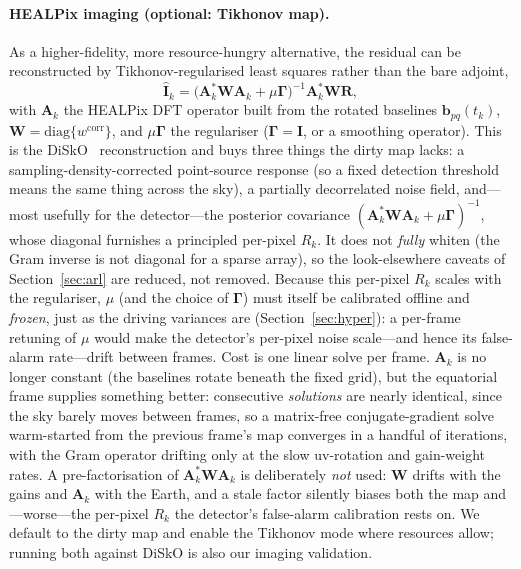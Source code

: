 \documentclass[11pt]{article}
\begin{document}
\paragraph{HEALPix imaging (optional: Tikhonov map).} As a higher-fidelity, more resource-hungry
alternative, the residual can be reconstructed by Tikhonov-regularised least squares rather than the
bare adjoint,
\begin{equation}
  \hat{\bm{I}}_k=\big(\bm{A}_k^{\!*}\bm{W}\bm{A}_k+\mu\bm{\Gamma}\big)^{-1}\bm{A}_k^{\!*}\bm{W}\bm{R},
\end{equation}
with $\bm{A}_k$ the HEALPix DFT operator built from the rotated baselines $\bm{b}_{pq}(t_k)$,
$\bm{W}=\mathrm{diag}\{w^{\mathrm{corr}}\}$, and $\mu\bm{\Gamma}$ the regulariser ($\bm{\Gamma}=\bm{I}$,
or a smoothing operator). This is the DiSkO~\cite{disko} reconstruction and buys three things the
dirty map lacks: a sampling-density-corrected point-source response (so a fixed detection threshold
means the same thing across the sky), a partially decorrelated noise field, and---most usefully for
the detector---the posterior covariance $(\bm{A}_k^{\!*}\bm{W}\bm{A}_k+\mu\bm{\Gamma})^{-1}$, whose
diagonal furnishes a principled per-pixel $R_k$. It does not \emph{fully} whiten (the Gram inverse
is not diagonal for a sparse array), so the look-elsewhere caveats of Section~\ref{sec:arl} are
reduced, not removed. Because this per-pixel $R_k$ scales with the regulariser, $\mu$ (and the
choice of $\bm{\Gamma}$) must itself be calibrated offline and \emph{frozen}, just as the driving
variances are (Section~\ref{sec:hyper}): a per-frame retuning of $\mu$ would make the detector's
per-pixel noise scale---and hence its false-alarm rate---drift between frames. Cost is one linear
solve per frame. $\bm{A}_k$ is no longer constant (the baselines rotate beneath the fixed grid),
but the equatorial frame supplies something better: consecutive \emph{solutions} are nearly
identical, since the sky barely moves between frames, so a matrix-free conjugate-gradient solve
warm-started from the previous frame's map converges in a handful of iterations, with the Gram
operator drifting only at the slow uv-rotation and gain-weight rates. A pre-factorisation of
$\bm{A}_k^{\!*}\bm{W}\bm{A}_k$ is deliberately \emph{not} used: $\bm{W}$ drifts with the gains and
$\bm{A}_k$ with the Earth, and a stale factor silently biases both the map and---worse---the
per-pixel $R_k$ the detector's false-alarm calibration rests on. We default to the dirty map and
enable the Tikhonov mode where resources allow; running both against DiSkO is also our imaging
validation.
\end{document}
